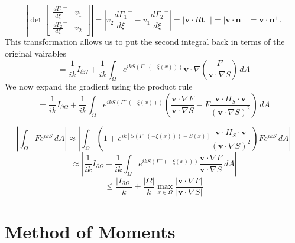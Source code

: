 \documentclass{article}
\newcommand{\abs}[1]{\left\lvert #1 \right\rvert}
\theoremstyle{plain}
\begin{document}
\begin{equation}
	\abs{ \det
	\begin{bmatrix}
		\frac{d\Gamma_1}{d\xi}^- & v_1 \\
		\frac{d\Gamma_2}{d\xi}^- & v_2 
	\end{bmatrix}}
	= \abs{ v_2\frac{d\Gamma_1}{d\xi}^- - v_1\frac{d\Gamma_2}{d\xi}^- }
	= \abs{ \mathbf{v}\cdot R\mathbf{t}^- }
	= \abs{ \mathbf{v}\cdot\mathbf{n}^- }
	= \mathbf{v}\cdot\mathbf{n}^+.
\end{equation}
This transformation allows us to put the second integral back in terms of the original vairables
\begin{equation}
	= \frac{1}{ik} I_{\partial\Omega}
	+ \frac{1}{ik} \int_\Omega
	e^{ikS\left( \Gamma^-\left(-\xi(x)\right) \right)} \mathbf{v}\cdot\nabla\left(
	\frac{F}{\mathbf{v}\cdot\nabla S} 
	\right) \,dA
\end{equation}
We now expand the gradient using the product rule
\begin{equation}
	= \frac{1}{ik} I_{\partial\Omega}
	+ \frac{1}{ik} \int_\Omega
	e^{ikS\left( \Gamma^-\left(-\xi(x)\right) \right)} \left(
	\frac{\mathbf{v}\cdot\nabla F}{\mathbf{v}\cdot\nabla S}
	- F\frac{\mathbf{v}\cdot H_S\cdot\mathbf{v}}{(\mathbf{v}\cdot\nabla S)^2} 
	\right) \,dA
\end{equation}


\begin{equation}
	\abs{ \int_\Omega Fe^{ikS} \,dA }
	\approx \abs{ \int_\Omega \left( 1 + e^{ik\left[S\left( \Gamma^-\left(-\xi(x)\right) \right)-S(x)\right]}
	\frac{\mathbf{v}\cdot H_S\cdot\mathbf{v}}{(\mathbf{v}\cdot\nabla S)^2} \right)Fe^{ikS} \,dA }
\end{equation}
\begin{equation}
	\approx \abs{ \frac{1}{ik} I_{\partial\Omega}
	+ \frac{1}{ik} \int_\Omega
	e^{ikS\left( \Gamma^-\left(-\xi(x)\right) \right)}
	\frac{\mathbf{v}\cdot\nabla F}{\mathbf{v}\cdot\nabla S} \,dA }
\end{equation}
\begin{equation}
	\leq \frac{ \abs{ I_{\partial\Omega} } }{k}
	+ \frac{\abs{\Omega}}{k} \max_{x\in\Omega}\frac{\abs{\mathbf{v}\cdot\nabla F}}{\abs{\mathbf{v}\cdot\nabla S}}
\end{equation}





\section{Method of Moments}\label{sec_mom}
\end{document}
